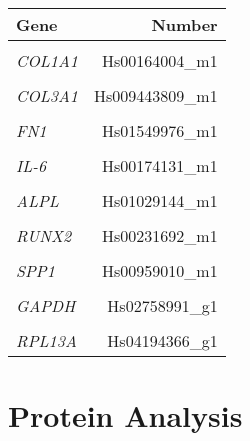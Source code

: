 \begin{tabular}{lr}
	Gene & Number \\ 
	\hline 
	\rule[-1ex]{0pt}{4ex}  &  \\ 
	\textit{COL1A1} & Hs00164004\_m1 \\ 
	\hline 
	\rule[-1ex]{0pt}{2.5ex}  &  \\ 
	\textit{COL3A1} & Hs009443809\_m1 \\ 
	\hline 
	\rule[-1ex]{0pt}{2.5ex}  &  \\ 
	\textit{FN1} & Hs01549976\_m1 \\ 
	\hline 
	\rule[-1ex]{0pt}{2.5ex}  &  \\ 
	\textit{IL-6} & Hs00174131\_m1 \\ 
	\hline 
	\rule[-1ex]{0pt}{2.5ex}  &  \\ 
	\textit{ALPL} & Hs01029144\_m1 \\ 
	\hline 
	\rule[-1ex]{0pt}{2.5ex}  &  \\ 
	\textit{RUNX2} & Hs00231692\_m1 \\ 
	\hline 
	\rule[-1ex]{0pt}{2.5ex}  &  \\ 
	\textit{SPP1} & Hs00959010\_m1 \\ 
	\hline 
	\rule[-1ex]{0pt}{2.5ex}  &  \\ 
	\textit{GAPDH} & Hs02758991\_g1 \\ 
	\hline 
	\rule[-1ex]{0pt}{2.5ex}  &  \\ 
	\textit{RPL13A} & Hs04194366\_g1 \\ 
\end{tabular} 


\section{Protein Analysis}
